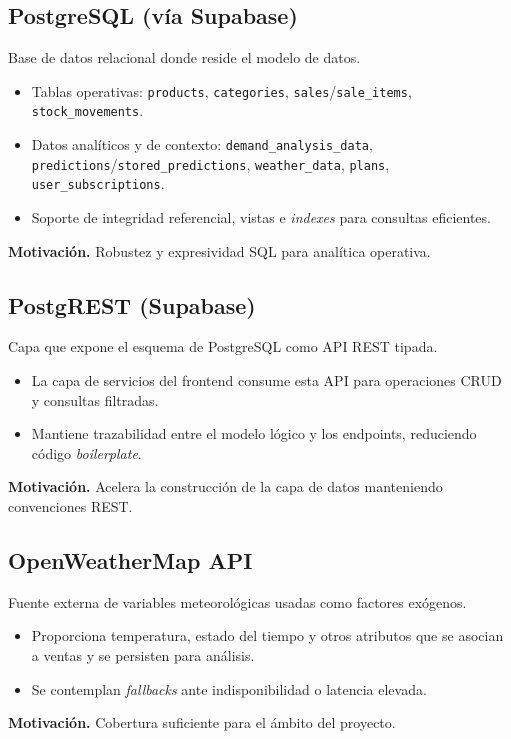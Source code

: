 \subsection{PostgreSQL (vía Supabase)}
Base de datos relacional donde reside el modelo de datos.
\begin{itemize}
    \item Tablas operativas: \texttt{products}, \texttt{categories}, \texttt{sales}/\texttt{sale\_items}, \texttt{stock\_movements}.
    \item Datos analíticos y de contexto: \texttt{demand\_analysis\_data}, \texttt{predictions}/\texttt{stored\_predictions}, \texttt{weather\_data}, \texttt{plans}, \texttt{user\_subscriptions}.
    \item Soporte de integridad referencial, vistas e \textit{indexes} para consultas eficientes.
\end{itemize}
\noindent\textbf{Motivación.} Robustez y expresividad SQL para analítica operativa.

\subsection{PostgREST (Supabase)}
Capa que expone el esquema de PostgreSQL como API REST tipada.
\begin{itemize}
    \item La capa de servicios del frontend consume esta API para operaciones CRUD y consultas filtradas.
    \item Mantiene trazabilidad entre el modelo lógico y los endpoints, reduciendo código \textit{boilerplate}.
\end{itemize}
\noindent\textbf{Motivación.} Acelera la construcción de la capa de datos manteniendo convenciones REST.

\subsection{OpenWeatherMap API}
Fuente externa de variables meteorológicas usadas como factores exógenos.
\begin{itemize}
    \item Proporciona temperatura, estado del tiempo y otros atributos que se asocian a ventas y se persisten para análisis.
    \item Se contemplan \textit{fallbacks} ante indisponibilidad o latencia elevada.
\end{itemize}
\noindent\textbf{Motivación.} Cobertura suficiente para el ámbito del proyecto.

